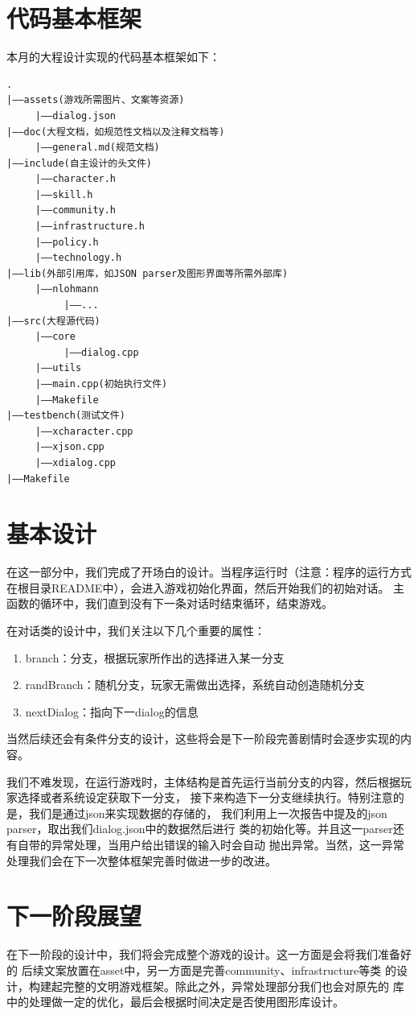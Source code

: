 \documentclass[UTF8]{ctexart}
\begin{document}
    \section{代码基本框架}
    本月的大程设计实现的代码基本框架如下：
\begin{lstlisting}
.
|——assets(游戏所需图片、文案等资源)
     |——dialog.json
|——doc(大程文档，如规范性文档以及注释文档等)
     |——general.md(规范文档)
|——include(自主设计的头文件)
     |——character.h
     |——skill.h
     |——community.h
     |——infrastructure.h
     |——policy.h
     |——technology.h
|——lib(外部引用库，如JSON parser及图形界面等所需外部库)
     |——nlohmann
          |——...
|——src(大程源代码)
     |——core
          |——dialog.cpp
     |——utils
     |——main.cpp(初始执行文件)
     |——Makefile
|——testbench(测试文件)
     |——xcharacter.cpp
     |——xjson.cpp
     |——xdialog.cpp
|——Makefile
\end{lstlisting}
    
    \section{基本设计}
    在这一部分中，我们完成了开场白的设计。当程序运行时（注意：程序的运行方式
    在根目录README中），会进入游戏初始化界面，然后开始我们的初始对话。
    主函数的循环中，我们直到没有下一条对话时结束循环，结束游戏。

    在对话类的设计中，我们关注以下几个重要的属性：
    \begin{enumerate}
        \item branch：分支，根据玩家所作出的选择进入某一分支
        \item randBranch：随机分支，玩家无需做出选择，系统自动创造随机分支
        \item nextDialog：指向下一dialog的信息
    \end{enumerate}
    
    当然后续还会有条件分支的设计，这些将会是下一阶段完善剧情时会逐步实现的内容。

    我们不难发现，在运行游戏时，主体结构是首先运行当前分支的内容，然后根据玩家选择或者系统设定获取下一分支，
    接下来构造下一分支继续执行。特别注意的是，我们是通过json来实现数据的存储的，
    我们利用上一次报告中提及的json parser，取出我们dialog.json中的数据然后进行
    类的初始化等。并且这一parser还有自带的异常处理，当用户给出错误的输入时会自动
    抛出异常。当然，这一异常处理我们会在下一次整体框架完善时做进一步的改进。
    
    \section{下一阶段展望}
    在下一阶段的设计中，我们将会完成整个游戏的设计。这一方面是会将我们准备好的
    后续文案放置在asset中，另一方面是完善community、infrastructure等类
    的设计，构建起完整的文明游戏框架。除此之外，异常处理部分我们也会对原先的
    库中的处理做一定的优化，最后会根据时间决定是否使用图形库设计。
\end{document}
